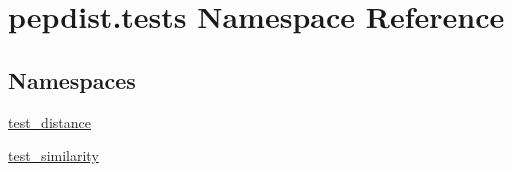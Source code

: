 \hypertarget{namespacepepdist_1_1tests}{}\section{pepdist.\+tests Namespace Reference}
\label{namespacepepdist_1_1tests}
\subsection*{Namespaces}
\begin{DoxyCompactItemize}
\item 
 \mbox{\hyperlink{namespacepepdist_1_1tests_1_1test__distance}{test\+\_\+distance}}
\item 
 \mbox{\hyperlink{namespacepepdist_1_1tests_1_1test__similarity}{test\+\_\+similarity}}
\end{DoxyCompactItemize}
